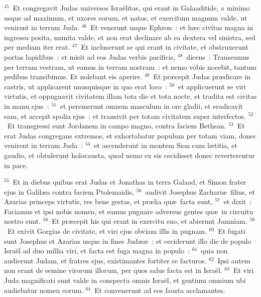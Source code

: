 ${}^{45}$~Et congregavit Judas universos Isra\"elitas, qui erant in Galaaditide, a minimo usque ad maximum, et uxores eorum, et natos, et exercitum magnum valde, ut venirent in terram Juda.
${}^{46}$~Et venerunt usque Ephron~: et h\ae c civitas magna in ingressu posita, munita valde, et non erat declinare ab ea dextera vel sinistra, sed per mediam iter erat.
${}^{47}$~Et incluserunt se qui erant in civitate, et obstruxerunt portas lapidibus~: et misit ad eos Judas verbis pacificis,
${}^{48}$~dicens~: Transeamus per terram vestram, ut eamus in terram nostram~: et nemo vobis nocebit, tantum pedibus transibimus. Et nolebant eis aperire.
${}^{49}$~Et pr\ae cepit Judas pr\ae dicare in castris, ut applicarent unusquisque in quo erat loco~:
${}^{50}$~et applicuerunt se viri virtutis, et oppugnavit civitatem illam tota die et tota nocte, et tradita est civitas in manu ejus~:
${}^{51}$~et peremerunt omnem masculum in ore gladii, et eradicavit eam, et accepit spolia ejus~: et transivit per totam civitatem super interfectos.
${}^{52}$~Et transgressi sunt Jordanem in campo magno, contra faciem Bethsan.
${}^{53}$~Et erat Judas congregans extremos, et exhortabatur populum per totam viam, donec venirent in terram Juda~:
${}^{54}$~et ascenderunt in montem Sion cum l\ae titia, et gaudio, et obtulerunt holocausta, quod nemo ex eis cecidisset donec reverterentur in pace.


${}^{55}$~Et in diebus quibus erat Judas et Jonathas in terra Galaad, et Simon frater ejus in Galil\ae a contra faciem Ptolemaidis,
${}^{56}$~audivit Josephus Zachari\ae\ filius, et Azarias princeps virtutis, res bene gestas, et pr\ae lia qu\ae\ facta sunt,
${}^{57}$~et dixit~: Faciamus et ipsi nobis nomen, et eamus pugnare adversus gentes qu\ae\ in circuitu nostro sunt.
${}^{58}$~Et pr\ae cepit his qui erant in exercitu suo, et abierunt Jamniam.
${}^{59}$~Et exivit Gorgias de civitate, et viri ejus obviam illis in pugnam.
${}^{60}$~Et fugati sunt Josephus et Azarias usque in fines Jud\ae \ae~: et ceciderunt illo die de populo Isra\"el ad duo millia viri, et facta est fuga magna in populo~:
${}^{61}$~quia non audierunt Judam, et fratres ejus, existimantes fortiter se facturos.
${}^{62}$~Ipsi autem non erant de semine virorum illorum, per quos salus facta est in Isra\"el.
${}^{63}$~Et viri Juda magnificati sunt valde in conspectu omnis Isra\"el, et gentium omnium ubi audiebatur nomen eorum.
${}^{64}$~Et convenerunt ad eos fausta acclamantes.


